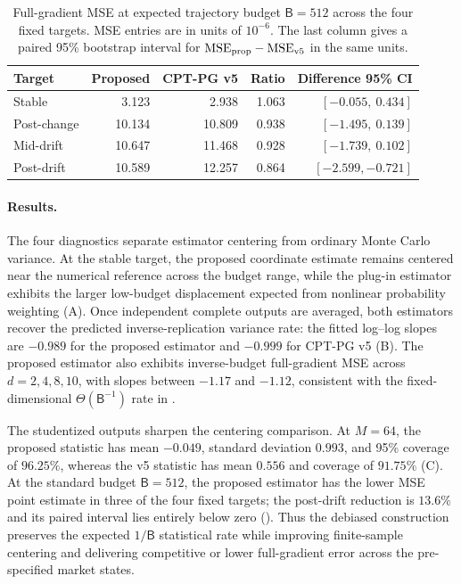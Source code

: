 \begin{table}[t]
\centering
\small
\caption{Full-gradient MSE at expected trajectory budget $\mathsf B=512$ across the four fixed targets.  MSE entries are in units of $10^{-6}$.  The last column gives a paired 95\% bootstrap interval for $\mathrm{MSE}_{\rm prop}-\mathrm{MSE}_{\rm v5}$ in the same units.}
\label{tab:e2-period-mse}
\begin{tabular}{lrrrr}
\toprule
Target & Proposed & CPT-PG v5 & Ratio & Difference 95\% CI \\
\midrule
Stable & 3.123 & 2.938 & 1.063 & $[-0.055,\ 0.434]$ \\
Post-change & 10.134 & 10.809 & 0.938 & $[-1.495,\ 0.139]$ \\
Mid-drift & 10.647 & 11.468 & 0.928 & $[-1.739,\ 0.102]$ \\
Post-drift & 10.589 & 12.257 & 0.864 & $[-2.599,-0.721]$ \\
\bottomrule
\end{tabular}
\end{table}
\FloatBarrier

\paragraph{Results.}
The four diagnostics separate estimator centering from ordinary Monte Carlo variance.  At the stable target, the proposed coordinate estimate remains centered near the numerical reference across the budget range, while the plug-in estimator exhibits the larger low-budget displacement expected from nonlinear probability weighting (A).  Once independent complete outputs are averaged, both estimators recover the predicted inverse-replication variance rate: the fitted log--log slopes are $-0.989$ for the proposed estimator and $-0.999$ for CPT-PG v5 (B).  The proposed estimator also exhibits inverse-budget full-gradient MSE across $d=2,4,8,10$, with slopes between $-1.17$ and $-1.12$, consistent with the fixed-dimensional $\Theta(\mathsf B^{-1})$ rate in .

The studentized outputs sharpen the centering comparison.  At $M=64$, the proposed statistic has mean $-0.049$, standard deviation $0.993$, and 95\% coverage of $96.25\%$, whereas the v5 statistic has mean $0.556$ and coverage of $91.75\%$ (C).  At the standard budget $\mathsf B=512$, the proposed estimator has the lower MSE point estimate in three of the four fixed targets; the post-drift reduction is $13.6\%$ and its paired interval lies entirely below zero ().  Thus the debiased construction preserves the expected $1/\mathsf B$ statistical rate while improving finite-sample centering and delivering competitive or lower full-gradient error across the pre-specified market states.
\FloatBarrier

